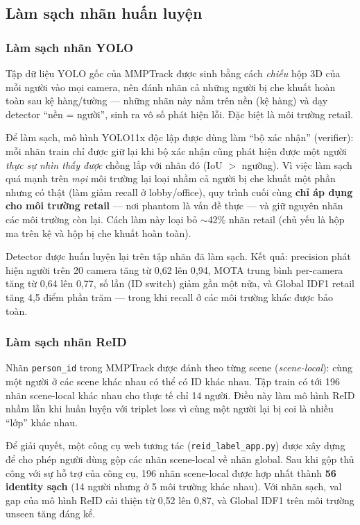 \documentclass{article} %
\begin{document}
\subsection{Làm sạch nhãn huấn luyện}
\label{sec:label_cleaning}

\subsubsection{Làm sạch nhãn YOLO}

Tập dữ liệu YOLO gốc của MMPTrack được sinh bằng cách \textit{chiếu} hộp 3D của mỗi người vào mọi camera, nên đánh nhãn cả những người bị che khuất hoàn toàn sau kệ hàng/tường  --- những nhãn này nằm trên nền (kệ hàng) và dạy detector ``nền = người'', sinh ra vô số phát hiện lỗi. Đặc biệt là môi trường retail.

Để làm sạch, mô hình YOLO11x độc lập được dùng làm ``bộ xác nhận'' (verifier): mỗi nhãn train chỉ được giữ lại khi bộ xác nhận cũng phát hiện được một người \textit{thực sự nhìn thấy được} chồng lắp với nhãn đó (IoU $>$ ngưỡng). Vì việc làm sạch quá mạnh trên \textit{mọi} môi trường lại loại nhầm cả người bị che khuất một phần nhưng có thật (làm giảm recall ở lobby/office), quy trình cuối cùng \textbf{chỉ áp dụng cho môi trường retail} --- nơi phantom là vấn đề thực --- và giữ nguyên nhãn các môi trường còn lại. Cách làm này loại bỏ $\sim$42\% nhãn retail (chủ yếu là hộp ma trên kệ và hộp bị che khuất hoàn toàn).

Detector được huấn luyện lại trên tập nhãn đã làm sạch. Kết quả: precision phát hiện người trên 20 camera tăng từ 0{,}62 lên 0{,}94, MOTA trung bình per-camera tăng từ 0{,}64 lên 0{,}77, số lần (ID switch) giảm gần một nửa, và Global IDF1 retail tăng 4,5 điểm phần trăm --- trong khi recall ở các môi trường khác được bảo toàn.

\subsubsection{Làm sạch nhãn ReID}

Nhãn \texttt{person\_id} trong MMPTrack được đánh theo từng scene (\textit{scene-local}): cùng một người ở các scene khác nhau có thể có ID khác nhau. Tập train có tới 196 nhãn scene-local khác nhau cho thực tế chỉ 14 người. Điều này làm mô hình ReID nhầm lẫn khi huấn luyện với triplet loss vì cùng một người lại bị coi là nhiều ``lớp'' khác nhau.

Để giải quyết, một công cụ web tương tác (\texttt{reid\_label\_app.py}) được xây dựng để cho phép người dùng gộp các nhãn scene-local về nhãn global. Sau khi gộp thủ công với sự hỗ trợ của công cụ, 196 nhãn scene-local được hợp nhất thành \textbf{56 identity sạch} (14 người nhưng ở 5 môi trường khác nhau). Với nhãn sạch, val gap của mô hình ReID cải thiện từ 0{,}52 lên 0{,}87, và Global IDF1 trên môi trường unseen tăng đáng kể.
\end{document}

